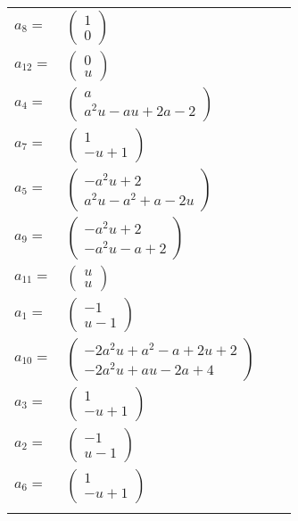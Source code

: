 \documentclass[1p]{elsarticle_modified}
\theoremstyle{definition}
\begin{document}
\begin{tabular}{m{7pt} m{180pt} m{7pt} m{180pt} }
\flushright $a_{8}=$&$\begin{pmatrix}1\\0\end{pmatrix}$ \\
\flushright $a_{12}=$&$\begin{pmatrix}0\\u\end{pmatrix}$ \\
\flushright $a_{4}=$&$\begin{pmatrix}a\\a^2 u- a u+2 a-2\end{pmatrix}$ \\
\flushright $a_{7}=$&$\begin{pmatrix}1\\- u+1\end{pmatrix}$ \\
\flushright $a_{5}=$&$\begin{pmatrix}- a^2 u+2\\a^2 u- a^2+a-2 u\end{pmatrix}$ \\
\flushright $a_{9}=$&$\begin{pmatrix}- a^2 u+2\\- a^2 u- a+2\end{pmatrix}$ \\
\flushright $a_{11}=$&$\begin{pmatrix}u\\u\end{pmatrix}$ \\
\flushright $a_{1}=$&$\begin{pmatrix}-1\\u-1\end{pmatrix}$ \\
\flushright $a_{10}=$&$\begin{pmatrix}-2 a^2 u+a^2- a+2 u+2\\-2 a^2 u+a u-2 a+4\end{pmatrix}$ \\
\flushright $a_{3}=$&$\begin{pmatrix}1\\- u+1\end{pmatrix}$ \\
\flushright $a_{2}=$&$\begin{pmatrix}-1\\u-1\end{pmatrix}$ \\
\flushright $a_{6}=$&$\begin{pmatrix}1\\- u+1\end{pmatrix}$\\&\end{tabular}
\end{document}
